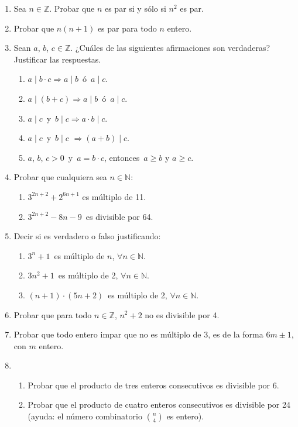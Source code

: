 \documentclass[a4paper,12pt,twoside,spanish,reqno]{amsbook}
\numberwithin{equation}{section}
\begin{document}
\begin{enumerate}
\item Sea $n\in \mathbb Z$. Probar que $n$ es par si y sólo si $n^2$ es par.


\item Probar que $n(n+1)$ es par para todo $n$ entero.


\item Sean $a$, $b$, $c \in {\mathbb Z}$. ¿Cuáles de las siguientes afirmaciones son verdaderas? Justificar las respuestas.
  \begin{enumerate}
  \item $a \mid b\cdot c \Rightarrow a \mid b$\, ó \,$a \mid c$.
  \item $a \mid (b+c) \Rightarrow a\mid b$\, ó \,$a \mid c$.
  \item $a \mid c$\, y \,$b \mid c \Rightarrow a\cdot b \mid c$.
  \item $a \mid c$\, y \,$b \mid c$ $\Rightarrow (a +b) \mid c$.
  \item $a$, $b$, $c>0$\, y \,$a=b\cdot c$, entonces\, $a \ge b$ y $a \ge c$.
  \end{enumerate}



\item Probar que cualquiera sea $n \in {\mathbb N}$:
  \begin{enumerate}
  \item $3^{2n+2}+ 2^{6n+1}$ es múltiplo de 11.
  \item $3^{2n+2} - 8n - 9$\, es divisible por 64.
  \end{enumerate}


\item Decir si es verdadero o falso justificando:
  \begin{enumerate}
  \item $3^n+1$\, es múltiplo de $n$, $\forall n \in {\mathbb N}$.
  \item $3n^2+1$\, es múltiplo de 2, $\forall n \in {\mathbb N}$.
  \item $(n+1)\cdot (5n+2)$\, es múltiplo de 2, $\forall n \in {\mathbb N}$.
  \end{enumerate}


\item Probar que para todo $n \in {\mathbb Z}$, $n^2 + 2$ no es divisible por 4.


\item Probar que todo entero impar que no es múltiplo de 3, es de la forma $6m\pm 1$, con $m$ entero.


\item 
\begin{enumerate}
 \item Probar que el producto de tres enteros consecutivos es divisible por 6.
 \item Probar que el producto de cuatro enteros consecutivos es divisible por 24 (ayuda: el número combinatorio $\binom{n}{4}$ es entero).
\end{enumerate}



\end{enumerate}
\end{document}
